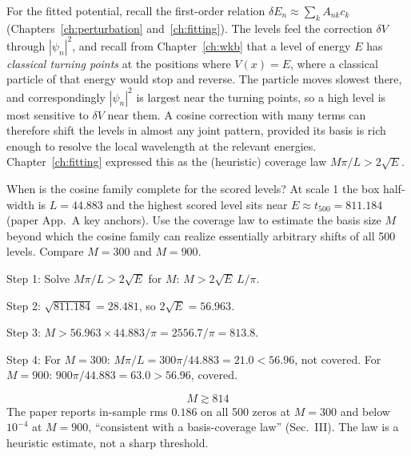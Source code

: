 For the fitted potential, recall the first-order relation $\delta E_n\approx\sum_kA_{nk}c_k$ (Chapters~\ref{ch:perturbation} and~\ref{ch:fitting}). The levels feel the correction $\delta V$ through $|\psi_n|^2$, and recall from Chapter~\ref{ch:wkb} that a level of energy $E$ has \emph{classical turning points} at the positions where $V(x)=E$, where a classical particle of that energy would stop and reverse. The particle moves slowest there, and correspondingly $|\psi_n|^2$ is largest near the turning points, so a high level is most sensitive to $\delta V$ near them. A cosine correction with many terms can therefore shift the levels in almost any joint pattern, provided its basis is rich enough to resolve the local wavelength at the relevant energies. Chapter~\ref{ch:fitting} expressed this as the (heuristic) coverage law $M\pi/L>2\sqrt E$.

\begin{sample}{When is the cosine family complete for the scored levels?}
At scale 1 the box half-width is $L=44.883$ and the highest scored level sits near $E\approx t_{500}=811.184$ (paper App.~A key anchors). Use the coverage law to estimate the basis size $M$ beyond which the cosine family can realize essentially arbitrary shifts of all 500 levels. Compare $M=300$ and $M=900$.

Step 1: Solve $M\pi/L>2\sqrt E$ for $M$: $M>2\sqrt E\,L/\pi$.

Step 2: $\sqrt{811.184}=28.481$, so $2\sqrt E=56.963$.

Step 3: $M>56.963\times44.883/\pi=2556.7/\pi=813.8$.

Step 4: For $M=300$: $M\pi/L=300\pi/44.883=21.0<56.96$, not covered. For $M=900$: $900\pi/44.883=63.0>56.96$, covered.

\[
\boxed{M\gtrsim814}
\]
The paper reports in-sample rms $0.186$ on all 500 zeros at $M=300$ and below $10^{-4}$ at $M=900$, ``consistent with a basis-coverage law'' (Sec.~III). The law is a heuristic estimate, not a sharp threshold.
\end{sample}

